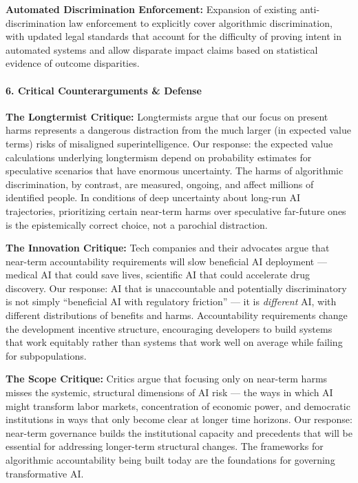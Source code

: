 \textbf{Automated Discrimination Enforcement:} Expansion of existing
anti-discrimination law enforcement to explicitly cover algorithmic
discrimination, with updated legal standards that account for the
difficulty of proving intent in automated systems and allow disparate
impact claims based on statistical evidence of outcome disparities.

\paragraph{6. Critical Counterarguments \&
Defense}\label{critical-counterarguments-defense-5}

\textbf{The Longtermist Critique:} Longtermists argue that our focus on
present harms represents a dangerous distraction from the much larger
(in expected value terms) risks of misaligned superintelligence. Our
response: the expected value calculations underlying longtermism depend
on probability estimates for speculative scenarios that have enormous
uncertainty. The harms of algorithmic discrimination, by contrast, are
measured, ongoing, and affect millions of identified people. In
conditions of deep uncertainty about long-run AI trajectories,
prioritizing certain near-term harms over speculative far-future ones is
the epistemically correct choice, not a parochial distraction.

\textbf{The Innovation Critique:} Tech companies and their advocates
argue that near-term accountability requirements will slow beneficial AI
deployment --- medical AI that could save lives, scientific AI that
could accelerate drug discovery. Our response: AI that is unaccountable
and potentially discriminatory is not simply ``beneficial AI with
regulatory friction'' --- it is \emph{different} AI, with different
distributions of benefits and harms. Accountability requirements change
the development incentive structure, encouraging developers to build
systems that work equitably rather than systems that work well on
average while failing for subpopulations.

\textbf{The Scope Critique:} Critics argue that focusing only on
near-term harms misses the systemic, structural dimensions of AI risk
--- the ways in which AI might transform labor markets, concentration of
economic power, and democratic institutions in ways that only become
clear at longer time horizons. Our response: near-term governance builds
the institutional capacity and precedents that will be essential for
addressing longer-term structural changes. The frameworks for
algorithmic accountability being built today are the foundations for
governing transformative AI.

